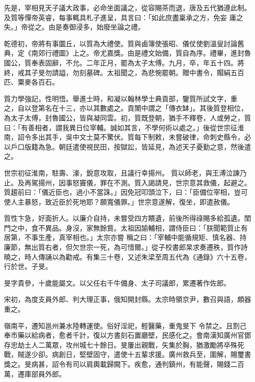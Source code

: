 \begin{pinyinscope}
 先是，宰相見天子議大政事，必命坐面議之，從容賜茶而退，唐及五代猶遵此制。及質等憚帝英睿，每事輒具札子進呈，具言曰：「如此庶盡稟承之方，免妄
 庸之失。」帝從之。由是奏御浸多，始廢坐論之禮。



 乾德初，帝將有事圜丘，以質為大禮使。質與鹵簿使張昭、儀仗使劉溫叟討論舊典，定《南郊行禮圖》上之。帝尤嘉獎。由是禮文始備，質自為序。禮畢，進封魯國公，質奉表固辭，不允。二年正月，罷為太子太傅。九月，卒，年五十四。將終，戒其子旻勿請謚，勿刻墓碑。太祖聞之，為悲惋罷朝。贈中書令，賵絹五百匹、粟麥各百石。



 質力學強記，性明悟。舉進士時，和凝以翰林學士典貢部，鑒質所試文字，重
 之，自以登第名在十三，亦以其數處之。貢闈中謂之「傳衣缽」。其後質登相位，為太子太傅，封魯國公，皆與凝同雲。初，質既登朝，猶手不釋卷，人或勞之，質曰：「有善相者，謂我異日位宰輔。誠如其言，不學何術以處之。」後從世宗征淮南，詔令多出其手，吳中文士莫不驚伏。質每下制敕，未嘗破律，命刺史縣令，必以戶口版籍為急。朝廷遣使視民田，按獄訟，皆延見，為述天子憂勤之意，然後遣之。



 世宗初征淮南，駐壽、濠，銳意攻取，且議行幸揚州。
 質以師老，與王溥泣諫乃止。及再駕揚州，因事怒竇儀，罪在不測。質入謁請見，世宗意其救儀，起避之。質趨前曰：「儀近臣也，過小不當誅。」因免冠叩頭泣下，曰：「臣備位宰相，豈可使人主暴怒，致近臣於死地耶？願寬儀罪。」世宗意遂解，復坐，即遣赦儀。



 質性卞急，好面折人。以廉介自持，未嘗受四方饋遺，前後所得祿賜多給孤遺。閨門之中，食不異品。身沒，家無餘貲。太祖因諭輔相，謂侍臣曰：「朕聞範質止有居第，不事生產，真宰相也。」太宗亦嘗
 稱之曰：「宰輔中能循規矩、慎名器、持廉節，無出質右者，但欠世宗一死，為可惜爾。」從子校書郎杲求奏遷秩，質作詩曉之，時人傳誦以為勸戒。有集三十卷，又述朱梁至周五代為《通錄》六十五卷，行於世。子旻。



 旻字貴參，十歲能屬文。以父任右千牛備身、太子司議郎，累遷著作佐郎。



 宋初，為度支員外郎、判大理正事，俄知開封縣。太宗時領京尹，數召與語，頗器重之。



 嶺南平，遷知邕州兼水陸轉運使。俗好淫祀，輕醫藥，重鬼旻下
 令禁之。且割己奉市藥以給病者，愈者千計，復以方書刻石置廳壁，民感化之。會南漢知廣州官鄧存忠劫土人二萬眾，攻州城七十餘日。旻屢出親戰，矢集於胸，猶激勵將卒殊死戰，賊遂少卻。病創日，堅壁固守，遣使十五輩求援。廣州救兵至，圍解，賜璽書獎之。旻病甚，詔令有司以肩輿載歸闕下。疾愈，通判鎮州，有能聲，賜錢二百萬，遷庫部員外郎。




\end{pinyinscope}
